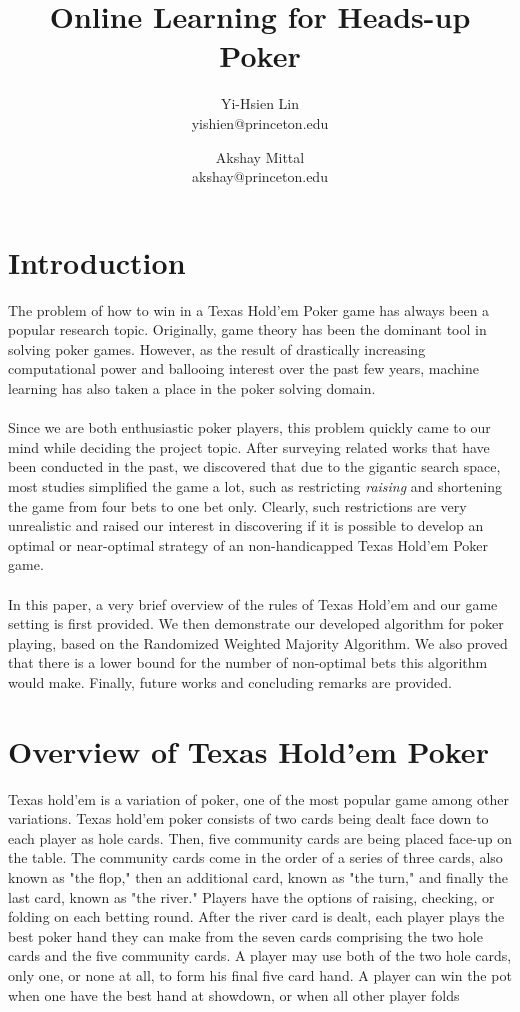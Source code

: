 \documentclass[12pt]{article}
\begin{document}
\title{Online Learning for Heads-up Poker}
\author{
	Yi-Hsien Lin \\ yishien@princeton.edu \and
	Akshay Mittal \\ akshay@princeton.edu
}
\date{}

\maketitle

\section{Introduction}
The problem of how to win in a Texas Hold'em Poker game has always been a popular research topic. Originally, game theory has been the dominant tool in solving poker games. However, as the result of drastically increasing computational power and ballooing interest over the past few years, machine learning  has also taken a place in the poker solving domain.\\
\\
Since we are both enthusiastic poker players, this problem quickly came to our mind while deciding the project topic. After surveying related works that have been conducted in the past, we discovered that due to the gigantic search space, most studies simplified the game a lot, such as restricting \emph{raising} and shortening the game from four bets to one bet only.
Clearly, such restrictions are very unrealistic and raised our interest in discovering if it is possible to develop an optimal or near-optimal strategy of an non-handicapped Texas Hold'em Poker game.\\
\\
In this paper, a very brief overview of the rules of Texas Hold'em and our game setting is first provided. We then demonstrate our developed algorithm for poker playing, based on the Randomized Weighted Majority Algorithm. We also proved that there is a lower bound for the number of non-optimal bets this algorithm would make. Finally, future works and concluding remarks are provided.


\section{Overview of Texas Hold'em Poker}
Texas hold'em is a variation of poker, one of the most popular game among other variations. Texas hold'em poker consists of two cards being dealt face down to each player as hole cards. Then, five community cards are being placed face-up on the table. The community cards come in the order of a series of three cards, also known as "the flop," then an additional card, known as "the turn," and finally the last card, known as "the river." Players have the options of raising, checking, or folding on each betting round. After the river card is dealt, each player plays the best poker hand they can make from the seven cards comprising the two hole cards and the five community cards. A player may use both of the two hole cards, only one, or none at all, to form his final five card hand. A player can win the pot when one have the best hand at showdown, or when all other player folds
\end{document}
